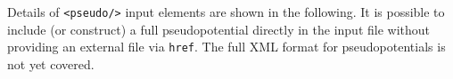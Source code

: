 

Details of \texttt{<pseudo/>} input elements are shown in the following.  It is possible to include (or construct) a full pseudopotential directly in the input file without providing an external file via \texttt{href}.  The full XML format for pseudopotentials is not yet covered.

\FloatBarrier
